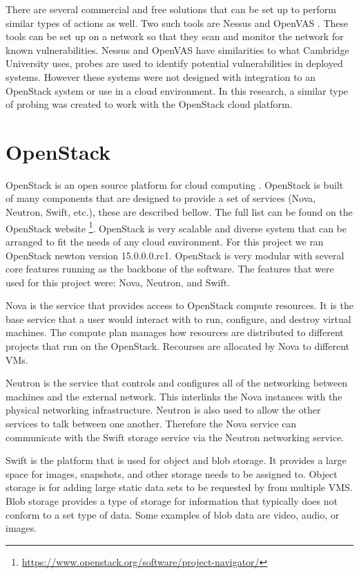 \documentclass[12pt]{article}
\begin{document}
There are several commercial and free solutions that can be set up to perform similar types of actions as well. Two such tools are Nessus \cite{Nessus} and OpenVAS \cite{OpenVAS}. These tools can be set up on a network so that they scan and monitor the network for known vulnerabilities. Nessus and OpenVAS have similarities to what Cambridge University uses, probes are used to identify potential vulnerabilities in deployed systems. However these systems were not designed with integration to an OpenStack system or use in a cloud environment. In this research, a similar type of probing was created to work with the OpenStack cloud platform.

\section{OpenStack}
OpenStack is an open source platform for cloud computing \cite{Openstack}. OpenStack is built of many components that are designed to provide a set of services (Nova, Neutron, Swift, etc.), these are described bellow. The full list can be found on the OpenStack website \footnote{ \href{https://www.openstack.org/software/project-navigator/}{https://www.openstack.org/software/project-navigator/}}. OpenStack is very scalable and diverse system that can be arranged to fit the needs of any cloud environment. For this project we ran OpenStack newton version 15.0.0.0.rc1. OpenStack is very modular with several core features running as the backbone of the software. The features that were used for this project were: Nova, Neutron, and Swift.

Nova is the service that provides access to OpenStack compute resources. It is the base service that a user would interact with to run, configure, and destroy virtual machines. The compute plan manages how resources are distributed to different projects that run on the OpenStack. Recourses are allocated by Nova to different VMs.

Neutron is the service that controls and configures all of the networking between machines and the external network. This interlinks the Nova instances with the physical networking infrastructure. Neutron is also used to allow the other services to talk between one another. Therefore the Nova service can communicate with the Swift storage service via the Neutron networking service.

Swift is the platform that is used for object and blob storage. It provides a large space for images, snapshots, and other storage needs to be assigned to. Object storage is for adding large static data sets to be requested by from multiple VMS. Blob storage provides a type of storage for information that typically does not conform to a set type of data. Some examples of blob data are video, audio, or images.
\end{document}
